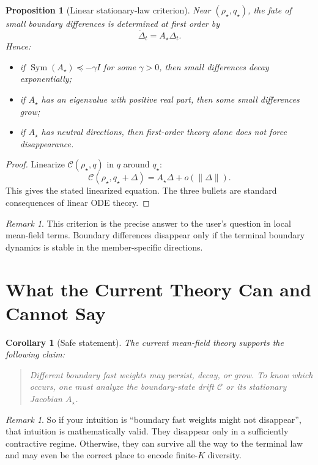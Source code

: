 \documentclass[11pt]{article}
\newcommand{\Sym}{\operatorname{Sym}}
\newtheorem{proposition}[theorem]{Proposition}
\newtheorem{corollary}[theorem]{Corollary}
\theoremstyle{remark}
\newtheorem{remark}[theorem]{Remark}
\begin{document}
\begin{proposition}[Linear stationary-law criterion]
\label{prop:linear-criterion}
Near $(\rho_\star,q_\star)$, the fate of small boundary differences is determined at first order by
\[
\dot\Delta_t=A_\star \Delta_t.
\]
Hence:
\begin{itemize}
\item if $\Sym(A_\star)\preceq -\gamma I$ for some $\gamma>0$, then small differences decay exponentially;
\item if $A_\star$ has an eigenvalue with positive real part, then some small differences grow;
\item if $A_\star$ has neutral directions, then first-order theory alone does not force disappearance.
\end{itemize}
\end{proposition}

\begin{proof}
Linearize $\mathcal C(\rho_\star,q)$ in $q$ around $q_\star$:
\[
\mathcal C(\rho_\star,q_\star+\Delta)
=
A_\star \Delta + o(\|\Delta\|).
\]
This gives the stated linearized equation. The three bullets are standard consequences of linear ODE theory.
\end{proof}

\begin{remark}
This criterion is the precise answer to the user's question in local mean-field terms. Boundary differences disappear only if the terminal boundary dynamics is stable in the member-specific directions.
\end{remark}

\section{What the Current Theory Can and Cannot Say}

\begin{corollary}[Safe statement]
\label{cor:safe}
The current mean-field theory supports the following claim:

\begin{quote}
Different boundary fast weights may persist, decay, or grow. To know which occurs, one must analyze the boundary-state drift $\mathcal C$ or its stationary Jacobian $A_\star$.
\end{quote}
\end{corollary}

\begin{remark}
So if your intuition is ``boundary fast weights might not disappear'', that intuition is mathematically valid. They disappear only in a sufficiently contractive regime. Otherwise, they can survive all the way to the terminal law and may even be the correct place to encode finite-$K$ diversity.
\end{remark}
\end{document}
